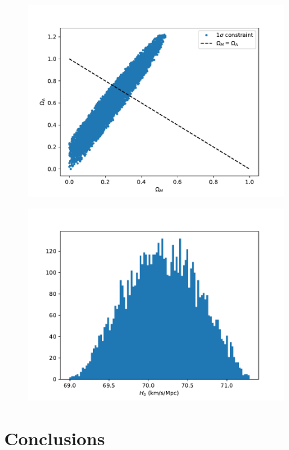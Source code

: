\documentclass{aa}
\begin{document}
\begin{figure}[ht]
\centering
\includegraphics[width=\hsize]{figures/fitting.pdf}
  \caption{}
     \label{}
\end{figure}

\begin{figure}[ht]
\centering
\includegraphics[width=\hsize]{figures/histogram.pdf}
  \caption{}
     \label{}
\end{figure}



\section{Conclusions}
\end{document}
